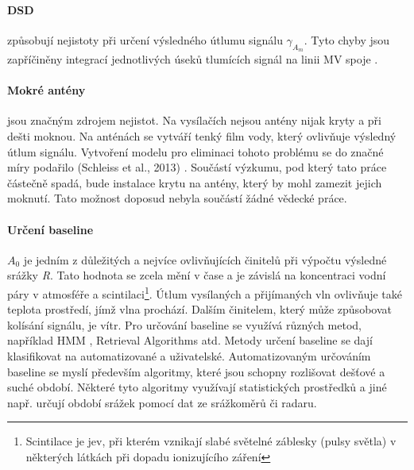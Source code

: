 \documentclass[a4paper,12pt,oneside]{report}
\begin{document}
\paragraph*{DSD} způsobují nejistoty při určení výsledného útlumu
signálu \emph{$\gamma_{A_{m}} $}. Tyto chyby jsou zapříčiněny
integrací jednotlivých úseků tlumících signál na linii MV
spoje \cite{mv1}.

\paragraph*{Mokré antény}jsou značným zdrojem nejistot. Na vysílačích
nejsou antény nijak kryty a při dešti moknou. Na anténách se vytváří
tenký film vody, který ovlivňuje výsledný útlum signálu. Vytvoření
modelu pro eliminaci tohoto problému se do značné míry podařilo
(Schleiss et al., 2013) \cite{wetat}. Součástí výzkumu, pod který tato
práce částečně spadá, bude instalace krytu na antény, který by mohl
zamezit jejich moknutí. Tato možnost doposud nebyla součástí žádné
vědecké práce.

\paragraph*{Určení baseline } \emph{$A_{0}$} je jedním z důležitých
a nejvíce ovlivňujících činitelů při výpočtu výsledné srážky
\emph{R}. Tato hodnota se zcela mění v čase a je závislá na
koncentraci vodní páry v atmosféře a scintilaci\footnote{Scintilace je jev, při kterém vznikají slabé světelné záblesky (pulsy světla) v některých látkách při dopadu ionizujícího záření}. Útlum vysílaných a
přijímaných vln ovlivňuje také teplota prostředí, jímž vlna
prochází. Dalším činitelem, který může způsobovat kolísání signálu, je
vítr.  Pro určování baseline se využívá různých metod, například
   \acs{HMM} \cite{comparsinmv}, Retrieval Algorithms
\cite{countryw} atd. Metody určení baseline se dají klasifikovat na
automatizované a uživatelské. Automatizovaným určováním baseline se
myslí především algoritmy, které jsou schopny rozlišovat dešťové a suché
období. Některé tyto algoritmy využívají statistických prostředků a
jiné např. určují období srážek pomocí dat ze srážkoměrů
\cite{countryw} či radaru.
\end{document}
